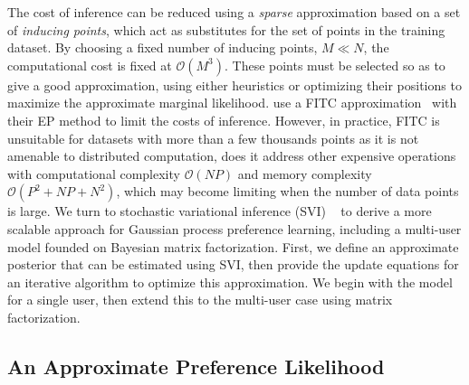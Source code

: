 The cost of inference can be reduced using a \emph{sparse} approximation based on a set of 
\emph{inducing points}, which act as substitutes for the set of points in the training dataset.
By choosing a fixed number of inducing points, $M \ll N$, the computational cost is fixed at $\mathcal{O}(M^3)$.
These points must be selected so as to give a good approximation, 
using either heuristics or optimizing their positions to maximize the approximate
marginal likelihood. 
\citet{houlsby2012collaborative} use a FITC approximation~\citep{snelson2006sparse} 
with their EP method to limit the costs of inference. However, in practice, FITC 
is unsuitable for datasets with more than a few thousands points
as it is not amenable to distributed computation, does it address other expensive operations
with computational complexity $\mathcal{O}(NP)$ and memory complexity $\mathcal{O}(P^2 + NP + N^2)$, which may 
become limiting when the number of data points is large\citep{hensman2015scalable}.  
We turn to stochastic variational inference (SVI) ~\citep{hoffman2013stochastic} 
to derive a more scalable approach
for Gaussian process preference learning, including
a multi-user model founded on Bayesian matrix factorization.
First, we define an approximate posterior that can be estimated using SVI, 
then provide the update equations for an iterative algorithm to optimize
this approximation. We begin with the model for a single user, then extend this to the multi-user case using matrix factorization. 

\subsection{An Approximate Preference Likelihood}

